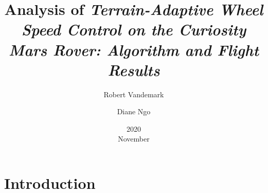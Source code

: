\documentclass[11pt]{report}
\title{Analysis of \em{Terrain-Adaptive Wheel Speed Control on the Curiosity Mars Rover: Algorithm and Flight Results}}
\date{2020\\ November}
\author{Robert Vandemark \and Diane Ngo}
\begin{document}
	\renewcommand*{\thepage}{\arabic{page}}
	\setcounter{page}{1}
	\setcounter{chapter}{1}
	\maketitle

	\section{Introduction}
	
\end{document}
